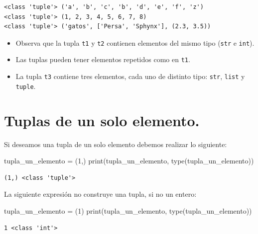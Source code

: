 \documentclass[
  spanish,
  letterpaper,
]{scrbook}
\newenvironment{Shaded}{\begin{snugshade}}{\end{snugshade}}
\newcommand{\BuiltInTok}[1]{\textcolor[rgb]{0.00,0.23,0.31}{#1}}
\newcommand{\DecValTok}[1]{\textcolor[rgb]{0.68,0.00,0.00}{#1}}
\newcommand{\NormalTok}[1]{\textcolor[rgb]{0.00,0.23,0.31}{#1}}
\newcommand{\OperatorTok}[1]{\textcolor[rgb]{0.37,0.37,0.37}{#1}}
\providecommand{\tightlist}{%
  \setlength{\itemsep}{0pt}\setlength{\parskip}{0pt}}
\theoremstyle{definition}
\theoremstyle{remark}
\begin{document}
\begin{verbatim}
<class 'tuple'> ('a', 'b', 'c', 'b', 'd', 'e', 'f', 'z')
<class 'tuple'> (1, 2, 3, 4, 5, 6, 7, 8)
<class 'tuple'> ('gatos', ['Persa', 'Sphynx'], (2.3, 3.5))
\end{verbatim}

\begin{itemize}
\tightlist
\item
  Observa que la tupla \texttt{t1} y \texttt{t2} contienen elementos del
  mismo tipo (\texttt{str} e \texttt{int}).
\item
  Las tuplas pueden tener elementos repetidos como en \texttt{t1}.
\item
  La tupla \texttt{t3} contiene tres elementos, cada uno de distinto
  tipo: \texttt{str}, \texttt{list} y \texttt{tuple}.
\end{itemize}

\section{Tuplas de un solo elemento.}\label{tuplas-de-un-solo-elemento.}

Si deseamos una tupla de un solo elemento debemos realizar lo siguiente:

\begin{Shaded}
\begin{Highlighting}[]
\NormalTok{tupla\_un\_elemento }\OperatorTok{=}\NormalTok{ (}\DecValTok{1}\NormalTok{,)}
\BuiltInTok{print}\NormalTok{(tupla\_un\_elemento, }\BuiltInTok{type}\NormalTok{(tupla\_un\_elemento))}
\end{Highlighting}
\end{Shaded}

\begin{verbatim}
(1,) <class 'tuple'>
\end{verbatim}

La siguiente expresión no construye una tupla, si no un entero:

\begin{Shaded}
\begin{Highlighting}[]
\NormalTok{tupla\_un\_elemento }\OperatorTok{=}\NormalTok{ (}\DecValTok{1}\NormalTok{)}
\BuiltInTok{print}\NormalTok{(tupla\_un\_elemento, }\BuiltInTok{type}\NormalTok{(tupla\_un\_elemento))}
\end{Highlighting}
\end{Shaded}

\begin{verbatim}
1 <class 'int'>
\end{verbatim}
\end{document}
